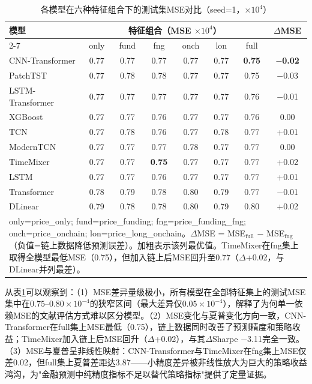 \documentclass[12pt,a4paper]{ctexart}
\begin{document}
\begin{table}[H]
\centering
\footnotesize
\setlength{\tabcolsep}{1.5pt}
\caption{各模型在六种特征组合下的测试集MSE对比（seed=1，$\times 10^{4}$）}
\label{tab:mse_ablation}
\begin{tabular}{lccccccc}
\toprule
\multirow{2}{*}{模型} & \multicolumn{6}{c}{特征组合（MSE $\times 10^{4}$）} & \multirow{2}{*}{$\Delta$MSE} \\
\cmidrule(lr){2-7}
& only & fund & fng & onch & lon & full \\
\midrule
CNN-Transformer & 0.77 & 0.77 & 0.77 & 0.77 & 0.77 & \bfseries0.75 & \bfseries$-$0.02 \\
PatchTST & 0.77 & 0.78 & 0.78 & 0.77 & 0.77 & 0.75 & $-$0.03 \\
LSTM-Transformer & 0.77 & 0.77 & 0.77 & 0.77 & 0.77 & 0.76 & $-$0.01 \\
XGBoost & 0.77 & 0.77 & 0.76 & 0.77 & 0.77 & 0.76 & 0.00 \\
TCN & 0.77 & 0.78 & 0.76 & 0.77 & 0.78 & 0.77 & +0.01 \\
ModernTCN & 0.77 & 0.77 & 0.77 & 0.78 & 0.77 & 0.77 & 0.00 \\
TimeMixer & 0.77 & 0.77 & \bfseries0.75 & 0.77 & 0.77 & 0.77 & +0.02 \\
LSTM & 0.77 & 0.77 & 0.76 & 0.77 & 0.77 & 0.77 & +0.01 \\
Transformer & 0.78 & 0.79 & 0.78 & 0.80 & 0.79 & 0.77 & $-$0.01 \\
DLinear & 0.79 & 0.78 & 0.78 & 0.80 & 0.79 & 0.80 & +0.02 \\
\bottomrule
\multicolumn{8}{p{\textwidth}}{\footnotesize only=price\_only; fund=price\_funding; fng=price\_funding\_fng; onch=price\_onchain; lon=price\_long\_onchain。$\Delta$MSE = MSE$_{\text{full}}$ $-$ MSE$_{\text{fng}}$（负值=链上数据降低预测误差）。加粗表示该列最优值。TimeMixer在fng集上取得全模型最低MSE（0.75），但加入链上后MSE回升至0.77（$\Delta$+0.02，与DLinear并列最差）。}
\end{tabular}
\end{table}

从表\ref{tab:mse_ablation}可以观察到：（1）MSE差异量级极小，所有模型在全部特征集上的测试MSE集中在$0.75$--$0.80\times10^{-4}$的狭窄区间（最大差异仅$0.05\times10^{-4}$），解释了为何单一依赖MSE的文献评估方式难以区分模型。（2）MSE变化与夏普变化方向一致，CNN-Transformer在full集上MSE最低（0.75），链上数据同时改善了预测精度和策略收益；TimeMixer加入链上后MSE回升（$\Delta$+0.02），与其$\Delta$Sharpe $-$3.11完全一致。（3）MSE与夏普呈非线性映射：CNN-Transformer与TimeMixer在fng集上MSE仅差0.02，但full集上夏普差距达3.87——小精度差异被非线性放大为巨大的策略收益鸿沟，为"金融预测中纯精度指标不足以替代策略指标"提供了定量证据。
\end{document}
